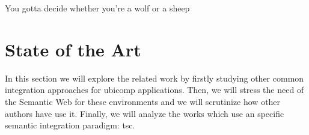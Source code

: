 

\begin{savequote}[50mm]
You gotta decide whether you’re a wolf or a sheep
%
\end{savequote}


\chapter{State of the Art}
\label{cha:stateoftheart}
\newcommand{\pathchaptwo}{2_state_of_the_art}

\ifpdf
    \graphicspath{{\pathchaptwo/figures/PNG/}{\pathchaptwo/figures/PDF/}{\pathchaptwo/figures/}}
\else
    \graphicspath{{\pathchaptwo/figures/EPS/}{\pathchaptwo/figures/}}
\fi




In this section we will explore the related work by firstly studying other common integration approaches for \ac{ubicomp} applications.
Then, we will stress the need of the Semantic Web for these environments and we will scrutinize how other authors have use it.
Finally, we will analyze the works which use an specific semantic integration paradigm: \acl{tsc}.











